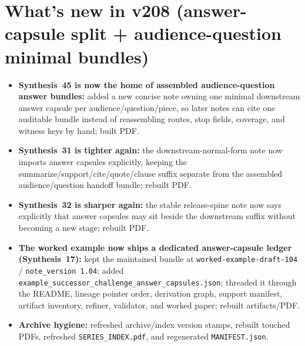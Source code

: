 \documentclass[11pt]{article}
\begin{document}
\section{What's new in v208 (answer-capsule split + audience-question minimal bundles)}
\begin{itemize}[leftmargin=*]
\item \textbf{Synthesis~45 is now the home of assembled audience-question answer bundles:} added a new concise note owning one minimal downstream answer capsule per audience/question/piece, so later notes can cite one auditable bundle instead of reassembling routes, stop fields, coverage, and witness keys by hand; built PDF.
\item \textbf{Synthesis~31 is tighter again:} the downstream-normal-form note now imports answer capsules explicitly, keeping the summarize/support/cite/quote/clause suffix separate from the assembled audience/question handoff bundle; rebuilt PDF.
\item \textbf{Synthesis~32 is sharper again:} the stable release-spine note now says explicitly that answer capsules may sit beside the downstream suffix without becoming a new stage; rebuilt PDF.
\item \textbf{The worked example now ships a dedicated answer-capsule ledger (Synthesis~17):} kept the maintained bundle at \texttt{worked-example-draft-104} / \texttt{note\_version 1.04}; added \texttt{example\_successor\_challenge\_answer\_capsules.json}; threaded it through the README, lineage pointer order, derivation graph, support manifest, artifact inventory, refiner, validator, and worked paper; rebuilt artifacts/PDF.
\item \textbf{Archive hygiene:} refreshed archive/index version stamps, rebuilt touched PDFs, refreshed \texttt{SERIES\_INDEX.pdf}, and regenerated \texttt{MANIFEST.json}.
\end{itemize}
\end{document}
